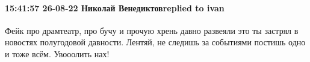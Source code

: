  
 
 
 
 

\paragraph{15:41:57 26-08-22 Николай Венедиктовreplied to ivan}

Фейк про драмтеатр, про бучу и прочую хрень давно развеяли это ты застрял в
новостях полугодовой давности. Лентяй, не следишь за событиями постишь одно и
тоже всём. Увооолить нах!
